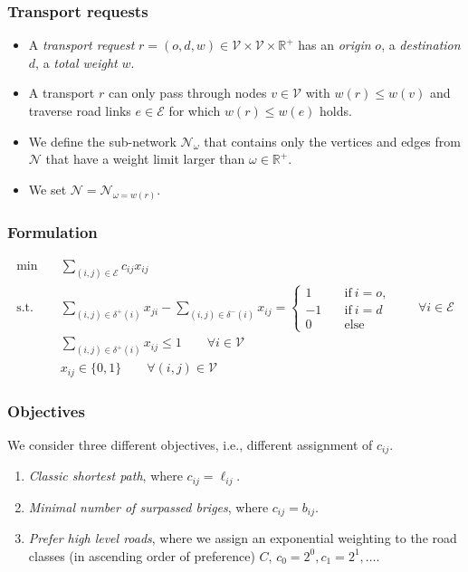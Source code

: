 \documentclass{beamer}   %
\theoremstyle{break}
\begin{document}
  \begin{frame}
    \frametitle{Transport requests}

    \begin{itemize}
      \item
      A \emph{transport request} $r=(o,d,w) \in \mathcal{V} \times \mathcal{V} \times \mathbb{R}^{+}$
      has an \emph{origin} $o$, a \emph{destination} $d$, a \emph{total weight} $w$.

      \item A transport $r$ can only pass through nodes $v \in \mathcal{V}$ with
      $w(r) \leq w(v)$ and traverse road links $e \in \mathcal{E}$ for which $w(r) \leq w(e)$ holds.

      \item We define the sub-network $\mathcal{N}_{\omega}$ that contains only the vertices and edges from $\mathcal{N}$ that have a weight limit larger than $\omega \in \mathbb{R}^{+}$.

      \item We set $\mathcal{N}=\mathcal{N}_{\omega=w(r)}$.
    \end{itemize}

  \end{frame}



  \begin{frame}
    \frametitle{Formulation}
    \begin{align}
      \min \quad &\sum_{(i,j)\in \mathcal{E}}  c_{ij} x_{ij} \label{obj} \\
      \text{s.t.}\quad &
      \sum_{(i,j)\in \delta^{+} (i)} x_{ji} - \sum_{(i,j)\in \delta^{-}(i)} x_{ij} =
      \begin{cases}
        1 \quad& \text{if}~ i=o, \\
        -1 \quad& \text{if}~ i=d \\
        0 \quad&\text{else}
      \end{cases}
      \qquad \forall i \in \mathcal{E}
      \\
      &  \sum_{(i,j)\in \delta^{+} (i)} x_ {ij} \leq 1     \qquad \forall i \in \mathcal{V}\\
      &  x_{ij} \in \{0,1\}   \qquad \forall (i,j) \in \mathcal{V}
    \end{align}
  \end{frame}


  \begin{frame}
    \frametitle{Objectives}
    We consider three different objectives, i.e., different assignment of $c_{ij}$.
    \begin{enumerate}
      \item \emph{Classic shortest path}, where $c_{ij}=\ell_{ij}$. \label{obj_short}
      \item \emph{Minimal number of surpassed briges}, where  $c_{ij}=b_{ij}$.  \label{obj_minBridge}
      \item \emph{Prefer high level roads}, where we assign an exponential weighting to the road classes (in ascending order of preference) $C$, $c_0=2^0,c_1=2^1, \ldots$.  \label{obj_highLevelRoad}
    \end{enumerate}
  \end{frame}
\end{document}
